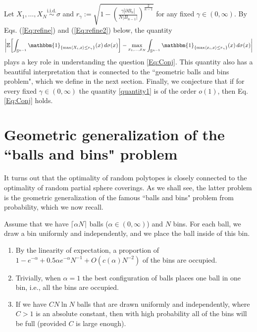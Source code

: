 Let $X_1,\ldots,X_N\stackrel{\text{i.i.d.}}{\sim} \sigma$ and $r_{\gamma} :=  {\sqrt{1-\left(\frac{\gamma|\partial B_n|}{N|B_{n-1}|}\right)^{\frac{2}{n-1}}}}$ for any fixed $\gamma \in (0,\infty).$ By Eqs. (\ref{Eq:refine}) and (\ref{Eq:refine2}) below, the quantity 
\begin{equation}\label{quantity1}
     \left|\E\left[\int_{\mathbb{S}^{n-1}}\mathbbm{1}_{\{\max\langle X_{i},x\rangle\leq r_\gamma\}}(x)\,d\sigma(x)\right] - \max_{x_1,\ldots,x_N}\int_{\mathbb{S}^{n-1}}\mathbbm{1}_{\{\max\langle x_{i},x\rangle\leq r_\gamma\}}(x)\,d\sigma(x)\right|
\end{equation}
plays a key role in understanding the question \eqref{Eq:Conj}. This quantity also has a beautiful interpretation that is connected to the ``geometric balls and bins problem", which we define in the next section. Finally, we conjecture that if for every fixed $\gamma \in (0,\infty)$ the quantity \eqref{quantity1} is of the order $o(1)$, then Eq. \eqref{Eq:Conj} holds.

 


\section{Geometric generalization of the ``balls and bins" problem}{\label{sphercovering}}

It turns out that the optimality of random polytopes is closely connected to the optimality of random partial sphere coverings. As we shall see, the latter problem is the geometric generalization of the famous ``balls and bins" problem from probability, which we now recall.

Assume that we have $\lceil \alpha N \rceil$ balls ($\alpha \in (0,\infty)$) and $N$ bins. For each ball, we draw a bin uniformly and independently, and we place the ball inside of this bin. 
\begin{enumerate}
	\item By the linearity of expectation, a proportion of $1-e^{-\alpha} + 0.5\alpha e^{-\alpha}N^{-1} + O( c(\alpha)N^{-2})$ of the bins are occupied.
	\item Trivially, when $\alpha=1$ the best configuration of balls places one ball in one bin, i.e., all the bins are occupied.
	\item  If we have $CN\ln N$ balls that are drawn uniformly and independently, where $C>1$ is an absolute constant, then with high probability all of the bins will be full (provided $C$ is large enough).
\end{enumerate}


